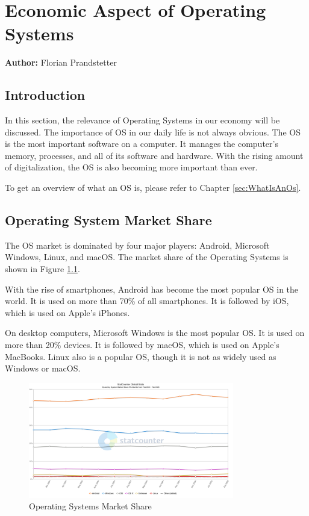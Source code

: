 \chapter{Economic Aspect of Operating Systems}
\label{chap:Economic_aspect_of_Operating_Systems}
\textbf{Author:} Florian Prandstetter

\section{Introduction}

In this section, the relevance of Operating Systems in our economy will be discussed. The importance of OS in our daily life is not always obvious.
The OS is the most important software on a computer. It manages the computer's memory, processes, and all of its software and hardware. 
With the rising amount of digitalization, the OS is also becoming more important than ever.

To get an overview of what an OS is, please refer to Chapter \ref{sec:WhatIsAnOs}.

\section{Operating System Market Share}

The OS market is dominated by four major players: Android, Microsoft Windows, Linux, and macOS.
The market share of the Operating Systems is shown in Figure \ref{fig:Operating_Systems_Market_Share}. 

With the rise of smartphones, Android has become the most popular OS in the world. It is used on more than 70\% of all smartphones. It is followed by iOS, which is used on Apple's iPhones.

On desktop computers, Microsoft Windows is the most popular OS. It is used on more than 20\% devices. It is followed by macOS, which is used on Apple's MacBooks. Linux also is a popular OS, though it is not as widely used as Windows or macOS.

\begin{figure}[H]
    \centering
    \includegraphics[width=0.8\textwidth]{figures/StatCounter-os_combined-ww-monthly-202402-202502.png}
    \caption{Operating Systems Market Share}
    \label{fig:Operating_Systems_Market_Share}
\end{figure}
\cite{Operating}


